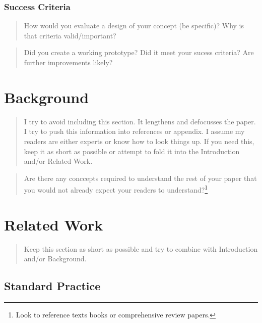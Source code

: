 \documentclass[
  10pt,
  draftcls,
  technote,
  letterpaper,
  oneside,
  onecolumn]{IEEEtran}
\begin{document}
\hypertarget{success-criteria}{%
\subsubsection{Success Criteria}\label{success-criteria}}

\begin{quote}
How would you evaluate a design of your concept (be specific)? Why is
that criteria valid/important?
\end{quote}

\begin{quote}
Did you create a working prototype? Did it meet your sucess criteria?
Are further improvements likely?
\end{quote}

\hypertarget{background}{%
\section{Background}\label{background}}

\begin{quote}
I try to avoid including this section. It lengthens and defocusses the
paper. I try to push this information into references or appendix. I
assume my readers are either experts or know how to look things up. If
you need this, keep it as short as possible or attempt to fold it into
the Introduction and/or Related Work.
\end{quote}

\begin{quote}
Are there any conccepts required to understand the rest of your paper
that you would not already expect your readers to understand?\footnote{Look
  to reference texts books or comprehensive review papers.}
\end{quote}

\hypertarget{related-work}{%
\section{Related Work}\label{related-work}}

\begin{quote}
Keep this section as short as possible and try to combine with
Introduction and/or Background.
\end{quote}

\hypertarget{standard-practice}{%
\subsection{Standard Practice}\label{standard-practice}}
\end{document}
